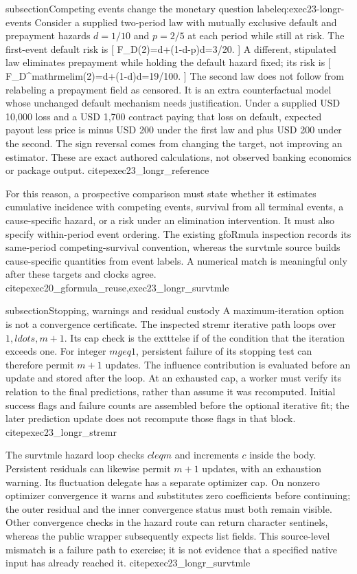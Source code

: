 subsection{Competing events change the monetary question}
label{eq:exec23-longr-events}
Consider a supplied two-period law with mutually exclusive default and
prepayment hazards $d=1/10$ and $p=2/5$ at each period while still at risk.
The first-event default risk is
[
 F_D(2)=d+(1-d-p)d=3/20.
]
A different, stipulated law eliminates prepayment while holding the default
hazard fixed; its risk is
[
 F_D^{mathrm{elim}}(2)=d+(1-d)d=19/100.
]
The second law does not follow from relabeling a prepayment field as censored.
It is an extra counterfactual model whose unchanged default mechanism needs
justification. Under a supplied USD 10,000 loss and a USD 1,700 contract
paying that loss on default, expected payout less price is minus USD 200
under the first law and plus USD 200 under the second. The sign reversal
comes from changing the target, not improving an estimator. These are exact
authored calculations, not observed banking economics or package output.
citep{exec23_longr_reference}

For this reason, a prospective comparison must state whether it estimates
cumulative incidence with competing events, survival from all terminal
events, a cause-specific hazard, or a risk under an elimination intervention.
It must also specify within-period event ordering. The existing gfoRmula
inspection records its same-period competing-survival convention, whereas
the survtmle source builds cause-specific quantities from event labels.
A numerical match is meaningful only after these targets and clocks agree.
citep{exec20_gformula_reuse,exec23_longr_survtmle}

subsection{Stopping, warnings and residual custody}
A maximum-iteration option is not a convergence certificate. The inspected
stremr iterative path loops over $1,ldots,m+1$. Its cap check is the
	exttt{else if} of the condition that the iteration exceeds one. For integer
$mgeq1$, persistent failure of its stopping test can therefore permit
$m+1$ updates. The influence contribution is evaluated before an update and
stored after the loop. At an exhausted cap, a worker must verify its relation
to the final predictions, rather than assume it was recomputed. Initial
success flags and failure counts are assembled before the optional iterative
fit; the later prediction update does not recompute those flags in that block.
citep{exec23_longr_stremr}

The survtmle hazard loop checks $cleq m$ and increments $c$ inside the body.
Persistent residuals can likewise permit $m+1$ updates, with an exhaustion
warning. Its fluctuation delegate has a separate optimizer cap. On nonzero
optimizer convergence it warns and substitutes zero coefficients before
continuing; the outer residual and the inner convergence status must both
remain visible. Other convergence checks in the hazard route can return
character sentinels, whereas the public wrapper subsequently expects list
fields. This source-level mismatch is a failure path to exercise; it is not
evidence that a specified native input has already reached it.
citep{exec23_longr_survtmle}


